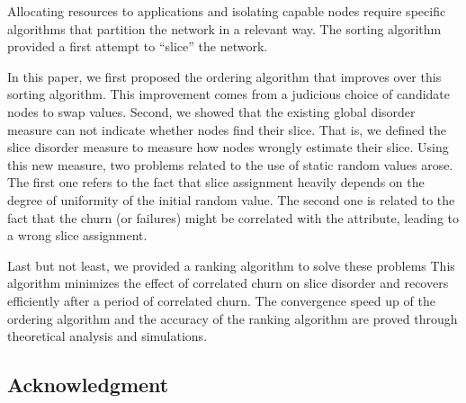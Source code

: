 \documentclass[times,10pt,twocolumn]{article}
\begin{document}
Allocating resources to applications and isolating capable nodes
require specific algorithms that partition the network in a relevant
way. 
The sorting algorithm~\cite{JK06} provided a first attempt to 
``slice'' the network. 


In this paper, 
we first proposed the ordering algorithm that improves over this sorting
algorithm.
This improvement comes from  
a judicious choice of candidate nodes to swap values. 
Second,
we showed that the existing global disorder measure can not
indicate whether nodes find their slice.
That is, we defined the slice disorder measure to measure
how nodes wrongly estimate their slice.
Using this new measure, two problems related to the use of 
static random values arose. 
The first one refers to the fact that slice assignment heavily depends on 
the degree of uniformity of the initial random value. 
The second one is related to the fact that
the churn (or failures) might be correlated with the
attribute, leading to 
a wrong slice assignment. 


Last but not least, we provided a ranking algorithm to solve these problems
This algorithm minimizes the effect of correlated churn on slice disorder
and recovers efficiently after a period of correlated churn.
The convergence speed up of the ordering algorithm and the accuracy of the 
ranking algorithm are proved through theoretical analysis and simulations. 


\subsection*{Acknowledgment}




\end{document}
